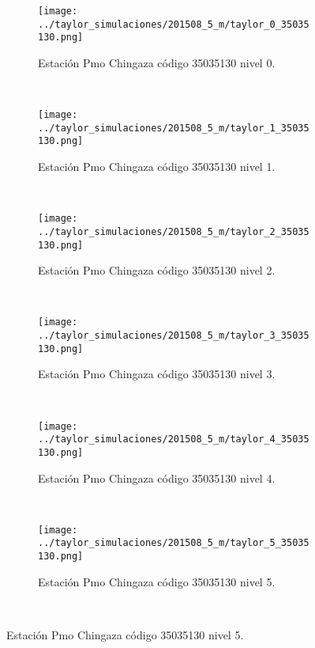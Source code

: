 \begin{figure}[H]\ContinuedFloat
\centering
\begin{subfigure}[normla]{0.4\textwidth}
\caption{Estación Pmo Chingaza  código 35035130 nivel 0.}
\texttt{[image: ../taylor\_simulaciones/201508\_5\_m/taylor\_0\_35035130.png]}
\end{subfigure}
~
\begin{subfigure}[normla]{0.4\textwidth}
\caption{Estación Pmo Chingaza  código 35035130 nivel 1.}
\texttt{[image: ../taylor\_simulaciones/201508\_5\_m/taylor\_1\_35035130.png]}
\end{subfigure}
~
\begin{subfigure}[normla]{0.4\textwidth}
\caption{Estación Pmo Chingaza  código 35035130 nivel 2.}
\texttt{[image: ../taylor\_simulaciones/201508\_5\_m/taylor\_2\_35035130.png]}
\end{subfigure}
~
\begin{subfigure}[normla]{0.4\textwidth}
\caption{Estación Pmo Chingaza  código 35035130 nivel 3.}
\texttt{[image: ../taylor\_simulaciones/201508\_5\_m/taylor\_3\_35035130.png]}
\end{subfigure}
~
\begin{subfigure}[normla]{0.4\textwidth}
\caption{Estación Pmo Chingaza  código 35035130 nivel 4.}
\texttt{[image: ../taylor\_simulaciones/201508\_5\_m/taylor\_4\_35035130.png]}
\end{subfigure}
~
\begin{subfigure}[normla]{0.4\textwidth}
\caption{Estación Pmo Chingaza  código 35035130 nivel 5.}
\texttt{[image: ../taylor\_simulaciones/201508\_5\_m/taylor\_5\_35035130.png]}
\end{subfigure}
~
\end{figure}
           
